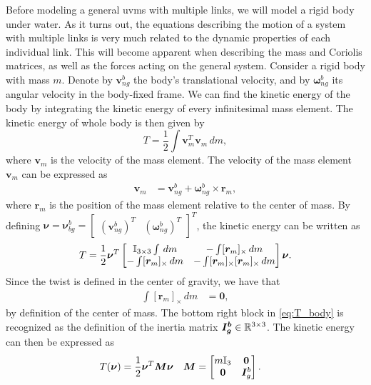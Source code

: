 Before modeling a general \gls{uvms} with multiple links, we will model
a rigid body under water. As it turns out, the equations describing the motion
of a system with multiple links is very much related to the dynamic properties
of each individual link. This will become apparent when describing the mass
and Coriolis matrices, as well as the forces acting on the general system.
Consider a rigid body with mass $m$. Denote by $\bm{v}_{ng}^b$ the body's translational
velocity, and by $\bm{\omega}_{ng}^b$ its angular velocity in the
body-fixed frame. We can find the kinetic energy of the body by integrating the
kinetic energy of every infinitesimal mass element. The kinetic energy
of whole body is then given by
\begin{equation}
    T = \frac{1}{2} \int \bm{v}_m^T \bm{v}_m\, dm,
\end{equation}
where $\bm{v}_m$ is the velocity of the mass element.
The velocity of the mass element $\bm{v}_m$ can be expressed as
\begin{align}
    \bm{v}_m &= \bm{v}_{ng}^b + \bm{\omega}_{ng}^b \times \bm{r}_m,
\end{align}
where $\bm{r}_m$ is the position of the mass element relative to the center of
mass. By defining $\bm{\nu} = \bm{\nu}_{bg}^b = \begin{bmatrix}(\bm{v}_{ng}^b)^T & (\bm{\omega}_{ng}^b)^T \end{bmatrix}^T$, the kinetic energy can be written as
\begin{align}
    T = \frac{1}{2} \bm{\nu}^T
    \begin{bmatrix}
        \mathbb{I}_{3\times 3} \int \,dm & - \int [\bm{r}_m]_\times \,dm \\
        - \int [\bm{r}_m]_\times \,dm & -\int [\bm{r}_m]_\times [\bm{r}_m]_\times \,dm
    \end{bmatrix}
    \bm{\nu}\label{eq:T_body}.
\end{align}
Since the twist is defined in the center of gravity, we have that
\begin{align}
    \int [\bm{r}_m]_{\times} \,dm &= \bm{0},
\end{align}
by definition of the center of mass. The bottom right block in \autoref{eq:T_body} is recognized as the
definition of the inertia matrix $\bm{I_g^b} \in \mathbb{R}^{3\times 3}$. The kinetic energy can then be
expressed as
\begin{align}
    T(\bm{\nu}) &= \frac{1}{2} \bm{\nu}^T \bm{M} \bm{\nu} \label{eq:TM_body} &
    \bm{M} &= \begin{bmatrix} m\mathbb{I}_{3} & \bm{0} \\ \bm{0} & \bm{I}_g^b \end{bmatrix}.
\end{align}
